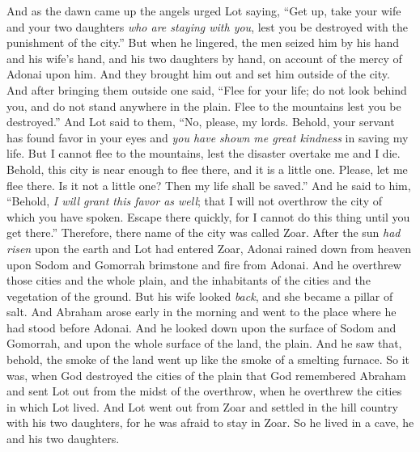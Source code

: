 \begin{biblechapter}
\verse And as the dawn came up the angels urged Lot saying, “Get up, take your wife and your two daughters \textit{who are staying with you}, lest you be destroyed with the punishment of the city.”
\verse But when he lingered, the men seized him by his hand and his wife’s hand, and his two daughters by hand, on account of the mercy of Adonai upon him. And they brought him out and set him outside of the city.
\verse And after bringing them outside one said, “Flee for your life; do not look behind you, and do not stand anywhere in the plain. Flee to the mountains lest you be destroyed.”
\verse And Lot said to them, “No, please, my lords.
\verse Behold, your servant has found favor in your eyes and \textit{you have shown me great kindness} in saving my life. But I cannot flee to the mountains, lest the disaster overtake me and I die.
\verse Behold, this city is near enough to flee there, and it is a little one. Please, let me flee there. Is it not a little one? Then my life shall be saved.”
\verse And he said to him, “Behold, \textit{I will grant this favor as well}; that I will not overthrow the city of which you have spoken.
\verse Escape there quickly, for I cannot do this thing until you get there.” Therefore, there name of the city was called Zoar.
 After the sun \textit{had risen} upon the earth and Lot had entered Zoar,
\verse Adonai rained down from heaven upon Sodom and Gomorrah brimstone and fire from Adonai.
\verse And he overthrew those cities and the whole plain, and the inhabitants of the cities and the vegetation of the ground.
\verse But his wife looked \textit{back}, and she became a pillar of salt.
\verse And Abraham arose early in the morning and went to the place where he had stood before Adonai.
\verse And he looked down upon the surface of Sodom and Gomorrah, and upon the whole surface of the land, the plain. And he saw that, behold, the smoke of the land went up like the smoke of a smelting furnace.
\verse So it was, when God destroyed the cities of the plain that God remembered Abraham and sent Lot out from the midst of the overthrow, when he overthrew the cities in which Lot lived.
 And Lot went out from Zoar and settled in the hill country with his two daughters, for he was afraid to stay in Zoar. So he lived in a cave, he and his two daughters.

\end{biblechapter}
